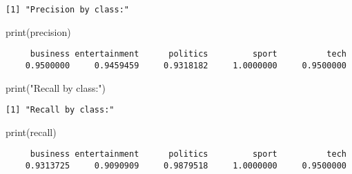 \documentclass[
  12pt,
  letterpaper,
  DIV=11,
  numbers=noendperiod]{scrartcl}
\newenvironment{Shaded}{\begin{snugshade}}{\end{snugshade}}
\newcommand{\FunctionTok}[1]{\textcolor[rgb]{0.28,0.35,0.67}{#1}}
\newcommand{\NormalTok}[1]{\textcolor[rgb]{0.00,0.23,0.31}{#1}}
\newcommand{\StringTok}[1]{\textcolor[rgb]{0.13,0.47,0.30}{#1}}
\begin{document}
\begin{verbatim}
[1] "Precision by class:"
\end{verbatim}

\begin{Shaded}
\begin{Highlighting}[]
\FunctionTok{print}\NormalTok{(precision)}
\end{Highlighting}
\end{Shaded}

\begin{verbatim}
     business entertainment      politics         sport          tech 
    0.9500000     0.9459459     0.9318182     1.0000000     0.9500000 
\end{verbatim}

\begin{Shaded}
\begin{Highlighting}[]
\FunctionTok{print}\NormalTok{(}\StringTok{"Recall by class:"}\NormalTok{)}
\end{Highlighting}
\end{Shaded}

\begin{verbatim}
[1] "Recall by class:"
\end{verbatim}

\begin{Shaded}
\begin{Highlighting}[]
\FunctionTok{print}\NormalTok{(recall)}
\end{Highlighting}
\end{Shaded}

\begin{verbatim}
     business entertainment      politics         sport          tech 
    0.9313725     0.9090909     0.9879518     1.0000000     0.9500000 
\end{verbatim}
\end{document}
